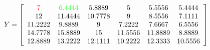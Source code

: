 \documentclass[varwidth=true]{standalone}
\begin{document}
\[
  Y = \left[\begin{array}{*6{c}}
    \color{red}{7} & \color{green}{6.4444} & 5.8889 & 5 & 5.5556 & 5.4444 \\
    12 & 11.4444 & 10.7778 & 9 & 8.5556 & 7.1111 \\
    11.2222 & 9.8889 & 9 & 7.2222 & 7.6667 & 6.5556 \\
    14.7778 & 15.8889 & 15 & 11.5556 & 11.8889 & 8.8889 \\
    12.8889 & 13.2222 & 12.1111 & 10.2222 & 12.3333 & 10.5556
  \end{array}\right]
  \]

\end{document}
